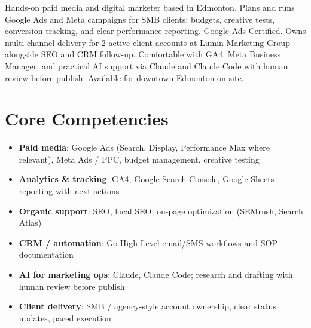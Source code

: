 \documentclass[11pt,a4paper,sans]{moderncv}
\begin{document}
\makecvtitle

\vspace{6pt}
\small{Hands-on paid media and digital marketer based in Edmonton. Plans and runs Google Ads and Meta campaigns for SMB clients: budgets, creative tests, conversion tracking, and clear performance reporting. Google Ads Certified. Owns multi-channel delivery for 2 active client accounts at Lumin Marketing Group alongside SEO and CRM follow-up. Comfortable with GA4, Meta Business Manager, and practical AI support via Claude and Claude Code with human review before publish. Available for downtown Edmonton on-site.}

\section{Core Competencies}
\vspace{1pt}
\begin{itemize}
\item \textbf{Paid media}: Google Ads (Search, Display, Performance Max where relevant), Meta Ads / PPC, budget management, creative testing
\item \textbf{Analytics \& tracking}: GA4, Google Search Console, Google Sheets reporting with next actions
\item \textbf{Organic support}: SEO, local SEO, on-page optimization (SEMrush, Search Atlas)
\item \textbf{CRM / automation}: Go High Level email/SMS workflows and SOP documentation
\item \textbf{AI for marketing ops}: Claude, Claude Code; research and drafting with human review before publish
\item \textbf{Client delivery}: SMB / agency-style account ownership, clear status updates, paced execution
\end{itemize}
\end{document}
